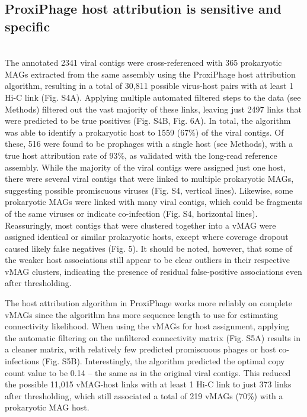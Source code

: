 \subsection*{ProxiPhage host attribution is sensitive and specific} \hfill\\
	The annotated 2341 viral contigs were cross-referenced with 365 prokaryotic MAGs extracted from the same assembly using the ProxiPhage host attribution algorithm, resulting in a total of 30,811 possible virus-host pairs with at least 1 Hi-C link (Fig. S4A). Applying multiple automated filtered steps to the data (see Methods) filtered out the vast majority of these links, leaving just 2497 links that were predicted to be true positives (Fig. S4B, Fig. 6A). In total, the algorithm was able to identify a prokaryotic host to 1559 (67\%) of the viral contigs. Of these, 516 were found to be prophages with a single host (see Methods), with a true host attribution rate of 93\%, as validated with the long-read reference assembly. While the majority of the viral contigs were assigned just one host, there were several viral contigs that were linked to multiple prokaryotic MAGs, suggesting possible promiscuous viruses (Fig. S4, vertical lines). Likewise, some prokaryotic MAGs were linked with many viral contigs, which could be fragments of the same viruses or indicate co-infection (Fig. S4, horizontal lines). Reassuringly, most contigs that were clustered together into a vMAG were assigned identical or similar prokaryotic hosts, except where coverage dropout caused likely false negatives (Fig. 5). It should be noted, however, that some of the weaker host associations still appear to be clear outliers in their respective vMAG clusters, indicating the presence of residual false-positive associations even after thresholding. 
    
    The host attribution algorithm in ProxiPhage works more reliably on complete vMAGs since the algorithm has more sequence length to use for estimating connectivity likelihood. When using the vMAGs for host assignment, applying the automatic filtering on the unfiltered connectivity matrix (Fig. S5A) results in a cleaner matrix, with relatively few predicted promiscuous phages or host co-infections (Fig. S5B). Interestingly, the algorithm predicted the optimal copy count value to be 0.14 – the same as in the original viral contigs. This reduced the possible 11,015 vMAG-host links with at least 1 Hi-C link to just 373 links after thresholding, which still associated a total of 219 vMAGs (70\%) with a prokaryotic MAG host.

